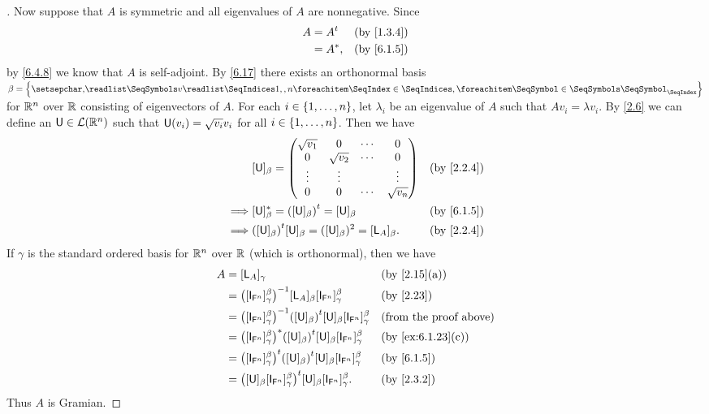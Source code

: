 \begin{proof}[]
	Now suppose that \(A\) is symmetric and all eigenvalues of \(A\) are nonnegative.
	Since
	\begin{align*}
		A & = \tp{A} &  & \by{1.3.4} \\
		  & = A^*,   &  & \by{6.1.5}
	\end{align*}
	by \cref{6.4.8} we know that \(A\) is self-adjoint.
	By \cref{6.17} there exists an orthonormal basis \(\beta = \set{\seq{v}{1,,n}}\) for \(\mathsf{\mathbb{R}}^n\) over \(\mathbb{R}\) consisting of eigenvectors of \(A\).
	For each \(i \in \left\lbrace1, \dots, n\right\rbrace\), let \(\lambda_i\) be an eigenvalue of \(A\) such that \(A v_i = \lambda v_i\).
	By \cref{2.6} we can define an \(\mathsf{U} \in \mathcal{L}(\mathsf{\mathbb{R}}^n)\) such that \(\mathsf{U}(v_i) = \sqrt{v_i} v_i\) for all \(i \in \left\lbrace1, \dots, n\right\rbrace\).
	Then we have
	\begin{align*}
		         & [\U]_{\beta} = \begin{pmatrix}
			                          \sqrt{v_1} & 0          & \cdots & 0          \\
			                          0          & \sqrt{v_2} & \cdots & 0          \\
			                          \vdots     & \vdots     &        & \vdots     \\
			                          0          & 0          & \cdots & \sqrt{v_n}
		                          \end{pmatrix}                      &  & \by{2.2.4}                     \\
		\implies & [\U]_{\beta}^* = \tp{([\U]_{\beta})} = [\U]_{\beta}                   &  & \by{6.1.5} \\
		\implies & \tp{([\U]_{\beta})} [\U]_{\beta} = ([\U]_{\beta})^2 = [\L_A]_{\beta}. &  & \by{2.2.4}
	\end{align*}
	If \(\gamma\) is the standard ordered basis for \(\mathsf{\mathbb{R}}^n\) over \(\mathbb{R}\) (which is orthonormal), then we have
	\begin{align*}
		A & = [\L_A]_{\gamma}                                                                                              &  & \by{2.15}[a]                  \\
		  & = \pa{[\IT[\vs{F}^n]]_{\gamma}^{\beta}}^{-1} [\L_A]_{\beta} [\IT[\vs{F}^n]]_{\gamma}^{\beta}                   &  & \by{2.23}                     \\
		  & = \pa{[\IT[\vs{F}^n]]_{\gamma}^{\beta}}^{-1} \tp{([\U]_{\beta})} [\U]_{\beta} [\IT[\vs{F}^n]]_{\gamma}^{\beta} &  & \text{(from the proof above)} \\
		  & = \pa{[\IT[\vs{F}^n]]_{\gamma}^{\beta}}^* \tp{([\U]_{\beta})} [\U]_{\beta} [\IT[\vs{F}^n]]_{\gamma}^{\beta}    &  & \by{ex:6.1.23}[c]             \\
		  & = \tp{\pa{[\IT[\vs{F}^n]]_{\gamma}^{\beta}}} \tp{([\U]_{\beta})} [\U]_{\beta} [\IT[\vs{F}^n]]_{\gamma}^{\beta} &  & \by{6.1.5}                    \\
		  & = \tp{\pa{[\U]_{\beta} [\IT[\vs{F}^n]]_{\gamma}^{\beta}}} [\U]_{\beta} [\IT[\vs{F}^n]]_{\gamma}^{\beta}.       &  & \by{2.3.2}
	\end{align*}
	Thus \(A\) is Gramian.
\end{proof}

